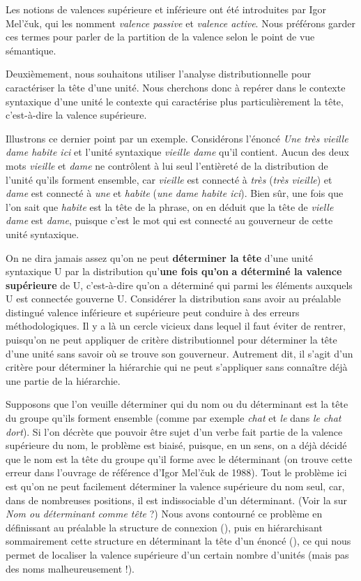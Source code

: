 Les notions de valences supérieure et inférieure ont été introduites par Igor Mel’čuk, qui les nomment \textit{valence passive} et \textit{valence active}. Nous préférons garder ces termes pour parler de la partition de la valence selon le point de vue sémantique.

Deuxièmement, nous souhaitons utiliser l’analyse distributionnelle pour caractériser la tête d’une unité. Nous cherchons donc à repérer dans le contexte syntaxique d’une unité le contexte qui caractérise plus particulièrement la tête, c’est-à-dire la valence supérieure.

Illustrons ce dernier point par un exemple. Considérons l’énoncé \textit{Une très vieille dame habite ici} et l’unité syntaxique \textit{vieille dame} qu’il contient. Aucun des deux mots \textit{vieille} et \textit{dame} ne contrôlent à lui seul l’entièreté de la distribution de l’unité qu’ils forment ensemble, car \textit{vieille} est connecté à \textit{très} (\textit{très vieille}) et \textit{dame} est connecté à \textit{une} et \textit{habite} (\textit{une dame habite ici}). Bien sûr, une fois que l’on sait que \textit{habite} est la tête de la phrase, on en déduit que la tête de \textit{vielle dame} est \textit{dame}, puisque c’est le mot qui est connecté au gouverneur de cette unité syntaxique.

On ne dira jamais assez qu’on ne peut \textbf{déterminer la tête} d’une unité syntaxique U par la distribution qu’\textbf{une fois qu’on} \textbf{a déterminé la valence supérieure} de U, c’est-à-dire qu’on a déterminé qui parmi les éléments auxquels U est connectée gouverne U. Considérer la distribution sans avoir au préalable distingué valence inférieure et supérieure peut conduire à des erreurs méthodologiques. Il y a là un cercle vicieux dans lequel il faut éviter de rentrer, puisqu’on ne peut appliquer de critère distributionnel pour déterminer la tête d’une unité sans savoir où se trouve son gouverneur. Autrement dit, il s’agit d’un critère pour déterminer la hiérarchie qui ne peut s’appliquer sans connaître déjà une partie de la hiérarchie.

Supposons que l’on veuille déterminer qui du nom ou du déterminant est la tête du groupe qu’ils forment ensemble (comme par exemple \textit{chat} et \textit{le} dans \textit{le chat dort}). Si l’on décrète que pouvoir être sujet d’un verbe fait partie de la valence supérieure du nom, le problème est biaisé, puisque, en un sens, on a déjà décidé que le nom est la tête du groupe qu’il forme avec le déterminant (on trouve cette erreur dans l’ouvrage de référence d’Igor Mel’čuk de 1988). Tout le problème ici est qu’on ne peut facilement déterminer la valence supérieure du nom seul, car, dans de nombreuses positions, il est indissociable d’un déterminant. (Voir la  sur \textit{Nom ou déterminant comme tête} ?) Nous avons contourné ce problème en définissant au préalable la structure de connexion (), puis en hiérarchisant sommairement cette structure en déterminant la tête d’un énoncé (), ce qui nous permet de localiser la valence supérieure d’un certain nombre d’unités (mais pas des noms malheureusement !).

